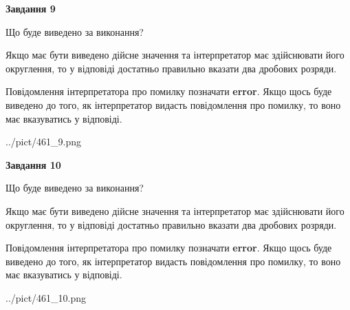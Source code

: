 \documentclass[12pt, ukrainian]{article}
\begin{document}
{\begin {Large}
{\begin {center}\textbf{Завдання 9}\end {center}}\par
Що буде виведено за виконання? \par

Якщо має бути виведено дійсне значення та інтерпретатор має здійснювати його округлення, 
то у відповіді достатньо правильно вказати два дробових розряди.

Повідомлення інтерпретатора про помилку позначати \textbf{error}.
Якщо щось буде виведено до того, як інтерпретатор видасть повідомлення про помилку, 
то воно має вказуватись у відповіді. \par

\begin{center}
	{../pict/461_9.png}
\end{center}
\newpage

{\begin {center}\textbf{Завдання 10}\end {center}}\par
Що буде виведено за виконання? \par

Якщо має бути виведено дійсне значення та інтерпретатор має здійснювати його округлення, 
то у відповіді достатньо правильно вказати два дробових розряди.

Повідомлення інтерпретатора про помилку позначати \textbf{error}.
Якщо щось буде виведено до того, як інтерпретатор видасть повідомлення про помилку, 
то воно має вказуватись у відповіді. \par

\begin{center}
	{../pict/461_10.png}
\end{center}
\newpage

\end {Large}}
\end{document}
